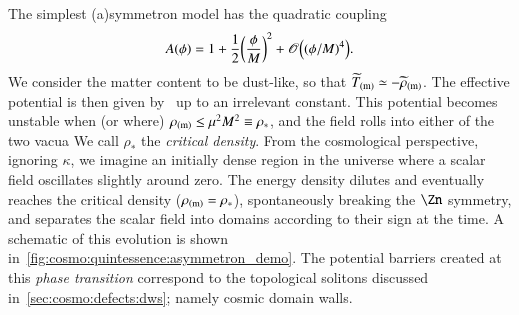     The simplest (a)symmetron model has the quadratic coupling
    \begin{equation}
        A(\phi)  = 1 +\frac{1}{2} {\left( \frac{\phi}{M} \right)}^2 + \mathscr{O}\Big( {(\phi/M)}^4 \Big).
    \end{equation}
    We consider the matter content to be dust-like, so that $\widetilde{T}_\mathrm{(m)}\simeq -\widetilde{\rho}_\mathrm{(m)}$. The effective potential is then given by~\citep{hinterbichlerSymmetronCosmology2011}%
    up to an irrelevant constant. %
    This potential becomes unstable when (or where) $\rho_\mathrm{(m)}\leq \mu^2M^2\equiv \rho_\ast$, and the field rolls into either of the two vacua We call $\rho_\ast$ the \textit{critical density}. From the cosmological perspective, ignoring $\kappa$, we imagine an initially dense region in the universe where a scalar field oscillates slightly around zero. The energy density dilutes and eventually reaches the critical density ($\rho_\mathrm{(m)}=\rho_\ast$), spontaneously breaking the $\Zn$ symmetry, and separates the scalar field into domains according to their sign at the time. A schematic of this evolution is shown in~\cref{fig:cosmo:quintessence:asymmetron_demo}. The potential barriers created at this \emph{phase transition} correspond to the topological solitons discussed in~\cref{sec:cosmo:defects:dws}; namely cosmic domain walls.




